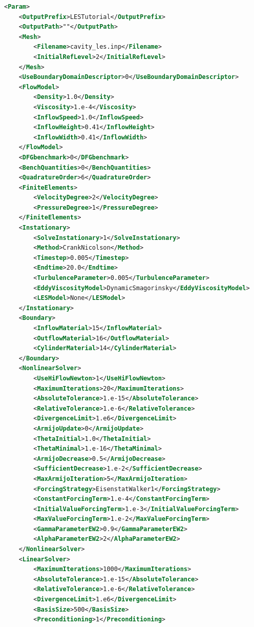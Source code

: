 \documentclass[a4paper, 11pt, twoside]{article}
\begin{document}
\begin{lstlisting}[language=XML, basicstyle={\footnotesize, \ttfamily}, keywordstyle=\color{blue}, numbers=none, tabsize=2]
<Param>
    <OutputPrefix>LESTutorial</OutputPrefix>
    <OutputPath>""</OutputPath>
    <Mesh>
        <Filename>cavity_les.inp</Filename>
        <InitialRefLevel>2</InitialRefLevel>
    </Mesh>
    <UseBoundaryDomainDescriptor>0</UseBoundaryDomainDescriptor>
    <FlowModel>
        <Density>1.0</Density>
        <Viscosity>1.e-4</Viscosity>
        <InflowSpeed>1.0</InflowSpeed>
        <InflowHeight>0.41</InflowHeight>
        <InflowWidth>0.41</InflowWidth>
    </FlowModel>
    <DFGbenchmark>0</DFGbenchmark>
    <BenchQuantities>0</BenchQuantities>
    <QuadratureOrder>6</QuadratureOrder>
    <FiniteElements>
        <VelocityDegree>2</VelocityDegree>
        <PressureDegree>1</PressureDegree>
    </FiniteElements>
    <Instationary>
        <SolveInstationary>1</SolveInstationary>
        <Method>CrankNicolson</Method>
        <Timestep>0.005</Timestep>
        <Endtime>20.0</Endtime>
        <TurbulenceParameter>0.005</TurbulenceParameter>
        <EddyViscosityModel>DynamicSmagorinsky</EddyViscosityModel>
        <LESModel>None</LESModel>
    </Instationary>
    <Boundary>
        <InflowMaterial>15</InflowMaterial>
        <OutflowMaterial>16</OutflowMaterial>
        <CylinderMaterial>14</CylinderMaterial>
    </Boundary>
    <NonlinearSolver>
        <UseHiFlowNewton>1</UseHiFlowNewton>
        <MaximumIterations>20</MaximumIterations>
        <AbsoluteTolerance>1.e-15</AbsoluteTolerance>
        <RelativeTolerance>1.e-6</RelativeTolerance>
        <DivergenceLimit>1.e6</DivergenceLimit>
        <ArmijoUpdate>0</ArmijoUpdate>
        <ThetaInitial>1.0</ThetaInitial>
        <ThetaMinimal>1.e-16</ThetaMinimal>
        <ArmijoDecrease>0.5</ArmijoDecrease>
        <SufficientDecrease>1.e-2</SufficientDecrease>
        <MaxArmijoIteration>5</MaxArmijoIteration>
        <ForcingStrategy>EisenstatWalker1</ForcingStrategy>
        <ConstantForcingTerm>1.e-4</ConstantForcingTerm>
        <InitialValueForcingTerm>1.e-3</InitialValueForcingTerm>
        <MaxValueForcingTerm>1.e-2</MaxValueForcingTerm>
        <GammaParameterEW2>0.9</GammaParameterEW2>
        <AlphaParameterEW2>2</AlphaParameterEW2>
    </NonlinearSolver>
    <LinearSolver>
        <MaximumIterations>1000</MaximumIterations>
        <AbsoluteTolerance>1.e-15</AbsoluteTolerance>
        <RelativeTolerance>1.e-6</RelativeTolerance>
        <DivergenceLimit>1.e6</DivergenceLimit>
        <BasisSize>500</BasisSize>
        <Preconditioning>1</Preconditioning>

\end{lstlisting}
\end{document}
